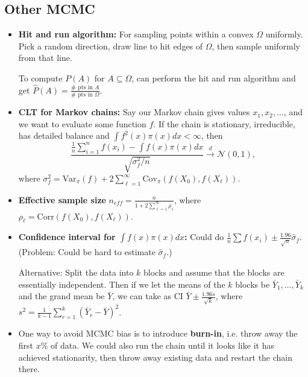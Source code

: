 \documentclass[twoside]{article}
\newcommand{\dis}{\displaystyle}
\newcommand\calN{\mathcal{N}}
\newcommand\Om{\Omega}
\newcommand\sg{\sigma}
\newcommand\goesto{\rightarrow}
\begin{document}
\subsection*{Other MCMC}
\begin{itemize}
\item \textbf{Hit and run algorithm:} For sampling points within a convex $\Om$ uniformly. Pick a random direction, draw line to hit edges of $\Om$, then sample uniformly from that line.

To compute $P(A)$ for $A \subseteq \Om$, can perform the hit and run algorithm and get $\hat{P}(A) = \dis\frac{\# \text{ pts in } A}{\# \text{ pts in } \Om}$.

\item \textbf{CLT for Markov chains:} Say our Markov chain gives values $x_1, x_2, \dots$, and we want to evaluate some function $f$. If the chain is stationary, irreducible, has detailed balance and $\dis\int f^2(x) \pi(x) dx < \infty$, then
\begin{equation*}
\frac{\frac{1}{n}\sum_{i=1}^n f(x_i) - \int f(x) \pi(x) dx }{\sqrt{\sg_f^2 / n}} \stackrel{d}{\goesto} \calN(0,1),
\end{equation*}
where $\sg_f^2 = \text{Var}_\pi (f) + 2 \dis\sum_{\ell=1}^\infty \text{Cov}_\pi \left(f(X_0), f(X_\ell) \right)$.

\item \textbf{Effective sample size} $n_{eff} = \dis\frac{n}{1 + 2\sum_{\ell = 1}^\infty \rho_\ell}$, where $\rho_\ell = \text{Corr}\left(f(X_0), f(X_\ell) \right)$.

\item \textbf{Confidence interval for $\dis\int f(x) \pi(x) dx$:} Could do $\dis\frac{1}{n}\sum f(x_i) \pm \frac{1.96}{\sqrt{n}} \hat{\sg}_f$. (Problem: Could be hard to estimate $\hat{\sg}_f$.)

Alternative: Split the data into $k$ blocks and assume that the blocks are essentially independent. Then if we let the means of the $k$ blocks be $\bar{Y}_1, \dots, \bar{Y}_k$ and the grand mean be $\bar{Y}$, we can take as CI $\bar{Y} \pm \dis\frac{1.96s}{\sqrt{k}}$, where $s^2 = \dis\frac{1}{k-1}\sum_{r=1}^k (\bar{Y}_r - \bar{Y})^2$.

\item One way to avoid MCMC bias is to introduce \textbf{burn-in}, i.e. throw away the first $x$\% of data. We could also run the chain until it looks like it has achieved stationarity, then throw away existing data and restart the chain there.


\end{itemize}
\end{document}
